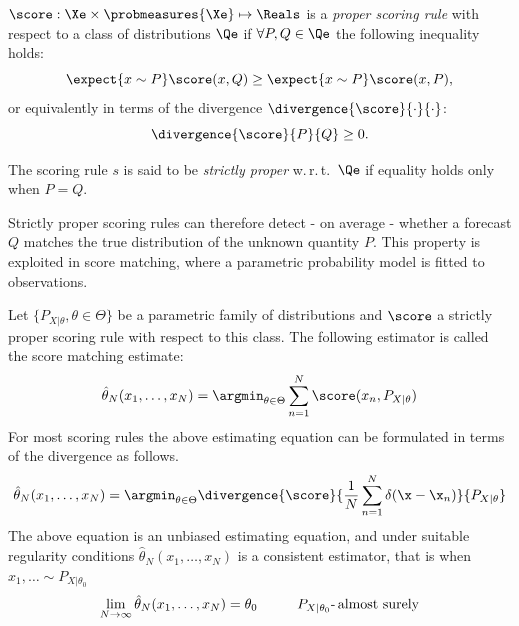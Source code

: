 \begin{definition}\label{def:strictly_proper}
	$\score:\Xe\times\probmeasures{\Xe}\mapsto\Reals$ is a \emph{proper scoring rule} with respect to a class of distributions $\Qe$ if $\forall P,Q\in\Qe$ the following inequality holds:
	\begin{equation}
		\expect{x\sim P} \score(x,Q) \geq \expect{x\sim P} \score(x,P),
	\end{equation}
	or equivalently in terms of the divergence $\divergence{\score}{\cdot}{\cdot}$:
	\begin{equation}
		\divergence{\score}{P}{Q} \geq 0.
	\end{equation}
	
	The scoring rule $s$ is said to be \emph{strictly proper} w.\,r.\,t.\ $\Qe$ if equality holds only when $P=Q$.
\end{definition}

Strictly proper scoring rules can therefore detect - on average - whether a forecast $Q$ matches the true distribution of the unknown quantity $P$. This property is exploited in score matching, where a parametric probability model is fitted to \iid observations.

\begin{definition}\label{def:score_matching}
Let $\{P_{X\vert\theta}, \theta\in\Theta\}$ be a parametric family of distributions and $\score$ a strictly proper scoring rule with respect to this class. The following estimator is called the score matching estimate:
\begin{equation}
	\hat{\theta}_N(x_1,\ldots,x_N) = \argmin_{\theta\in\Theta} \sum_{n=1}^{N}\score(x_n,P_{X\vert\theta}) \label{eqn:score_matching}
\end{equation}
For most scoring rules the above estimating equation can be formulated in terms of the divergence as follows.
\begin{equation}
	\hat{\theta}_N(x_1,\ldots,x_N) = \argmin_{\theta\in\Theta} \divergence{\score}{\frac{1}{N}\sum_{n=1}^{N}\delta(\x-\x_n)}{P_{X\vert\theta}}
\end{equation}
The above equation is an unbiased estimating equation, and under suitable regularity conditions $\hat{\theta}_N(x_1,\ldots,x_N)$ is a consistent estimator, that is when $x_1,\ldots\sim P_{X\vert\theta_0}$ \iid
\begin{equation}
	\lim_{N \rightarrow \infty} \hat{\theta}_N(x_1,\ldots,x_N) = \theta_0\hspace{1cm} P_{X\vert\theta_0}\mbox{-\,almost surely}
\end{equation}
\end{definition}

